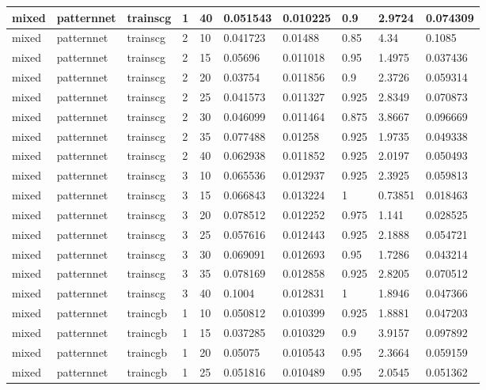 \begin{longtable}{lllllllll}
mixed & patternnet & trainscg & 1 & 40 & 0.051543 & 0.010225 & 0.9 & 2.9724 & 0.074309 \\ \hline 
mixed & patternnet & trainscg & 2 & 10 & 0.041723 & 0.01488 & 0.85 & 4.34 & 0.1085 \\ \hline 
mixed & patternnet & trainscg & 2 & 15 & 0.05696 & 0.011018 & 0.95 & 1.4975 & 0.037436 \\ \hline 
mixed & patternnet & trainscg & 2 & 20 & 0.03754 & 0.011856 & 0.9 & 2.3726 & 0.059314 \\ \hline 
mixed & patternnet & trainscg & 2 & 25 & 0.041573 & 0.011327 & 0.925 & 2.8349 & 0.070873 \\ \hline 
mixed & patternnet & trainscg & 2 & 30 & 0.046099 & 0.011464 & 0.875 & 3.8667 & 0.096669 \\ \hline 
mixed & patternnet & trainscg & 2 & 35 & 0.077488 & 0.01258 & 0.925 & 1.9735 & 0.049338 \\ \hline 
mixed & patternnet & trainscg & 2 & 40 & 0.062938 & 0.011852 & 0.925 & 2.0197 & 0.050493 \\ \hline 
mixed & patternnet & trainscg & 3 & 10 & 0.065536 & 0.012937 & 0.925 & 2.3925 & 0.059813 \\ \hline 
mixed & patternnet & trainscg & 3 & 15 & 0.066843 & 0.013224 & 1 & 0.73851 & 0.018463 \\ \hline 
mixed & patternnet & trainscg & 3 & 20 & 0.078512 & 0.012252 & 0.975 & 1.141 & 0.028525 \\ \hline 
mixed & patternnet & trainscg & 3 & 25 & 0.057616 & 0.012443 & 0.925 & 2.1888 & 0.054721 \\ \hline 
mixed & patternnet & trainscg & 3 & 30 & 0.069091 & 0.012693 & 0.95 & 1.7286 & 0.043214 \\ \hline 
mixed & patternnet & trainscg & 3 & 35 & 0.078169 & 0.012858 & 0.925 & 2.8205 & 0.070512 \\ \hline 
mixed & patternnet & trainscg & 3 & 40 & 0.1004 & 0.012831 & 1 & 1.8946 & 0.047366 \\ \hline 
mixed & patternnet & traincgb & 1 & 10 & 0.050812 & 0.010399 & 0.925 & 1.8881 & 0.047203 \\ \hline 
mixed & patternnet & traincgb & 1 & 15 & 0.037285 & 0.010329 & 0.9 & 3.9157 & 0.097892 \\ \hline 
mixed & patternnet & traincgb & 1 & 20 & 0.05075 & 0.010543 & 0.95 & 2.3664 & 0.059159 \\ \hline 
mixed & patternnet & traincgb & 1 & 25 & 0.051816 & 0.010489 & 0.95 & 2.0545 & 0.051362 \\ \hline 

\end{longtable}
